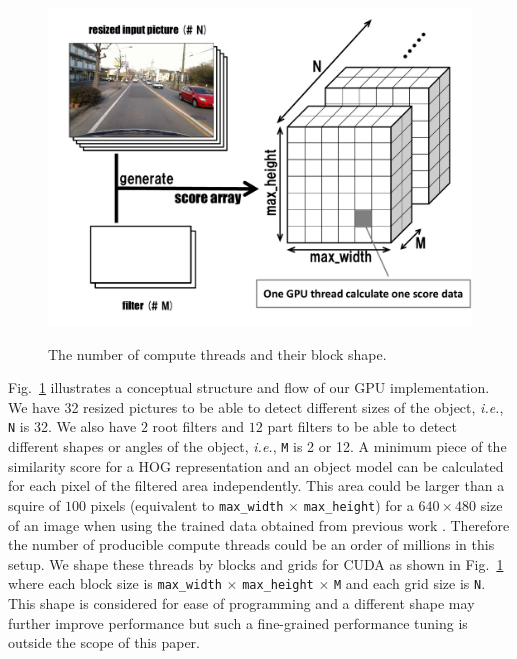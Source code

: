 \begin{figure}[t]
 \begin{center}
  \includegraphics[width=\hsize]{fig/threads_shape.pdf}\\
  \caption{The number of compute threads and their block shape.}
  \label{fig:threads_shape}
 \end{center}
\end{figure}

Fig.~\ref{fig:threads_shape} illustrates a conceptual structure and flow
of our GPU implementation.
We have 32 resized pictures to be able to detect different sizes of the
object, \textit{i.e.}, \texttt{N} is 32.
We also have $2$ root filters and $12$ part filters to be able to detect
different shapes or angles of the object, \textit{i.e.}, \texttt{M} is 2
or 12.
A minimum piece of the similarity score for a HOG representation and an
object model can be calculated for each pixel of the filtered area
independently.
This area could be larger than a squire of $100$ pixels (equivalent to
\texttt{max\_width} $\times$ \texttt{max\_height}) for a $640 \times 480$
size of an image when using the trained data obtained from previous work
\cite{Niknejad12}.
Therefore the number of producible compute threads could be an order of
millions in this setup.
We shape these threads by blocks and grids for CUDA as shown in
Fig.~\ref{fig:threads_shape} where each block size is \texttt{max\_width}
$\times$ \texttt{max\_height} $\times$ \texttt{M} and each grid size is
\texttt{N}.
This shape is considered for ease of programming and a different shape
may further improve performance but such a fine-grained performance
tuning is outside the scope of this paper.

